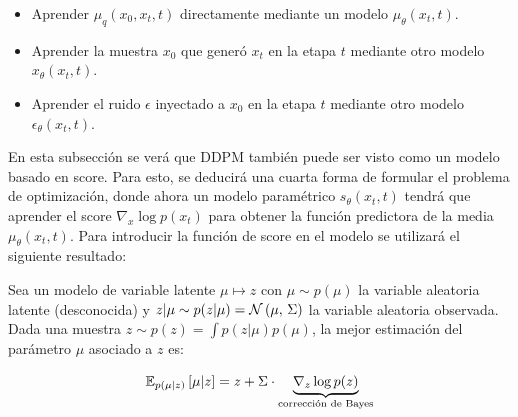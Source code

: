 \begin{itemize}
    \item Aprender $\mu_q(x_0,x_t,t)$ directamente mediante un modelo $\mu_\theta(x_t,t)$.
    \item Aprender la muestra $x_0$ que generó $x_t$ en la etapa $t$ mediante otro modelo $x_\theta(x_t,t)$.
    \item Aprender el ruido $\epsilon$ inyectado a $x_0$ en la etapa $t$ mediante otro modelo $\epsilon_\theta(x_t,t)$.
\end{itemize}

En esta subsección se verá que DDPM también puede ser visto como un modelo basado en score. Para esto, se deducirá una cuarta forma de formular el problema de optimización, donde ahora un modelo paramétrico $s_\theta(x_t,t)$ tendrá que aprender el score $\nabla_x\log p(x_t)$ para obtener la función predictora de la media $\mu_\theta(x_t,t)$. Para introducir la función de score en el modelo se utilizará el siguiente resultado:

\begin{teo}
    Sea un modelo de variable latente $\mu\mapsto z$ con $\mu\sim p(\mu)$ la variable aleatoria latente (desconocida) y $z|\mu\sim p(z|\mu)=\mathcal{N}\left(\mu,\,\Sigma\right)$ la variable aleatoria observada. Dada una muestra $z\sim p(z)= \int p(z|\mu) p(\mu)$, la mejor estimación del parámetro $\mu$ asociado a $z$ es:

    \begin{equation}
        \label{eq:tweedie}
        \mathbb{E}_{p(\mu|z)}\left[\mu|z\right] = z + \Sigma \cdot \underbrace{\nabla_z \log p(z)}_{\text{corrección de Bayes}}
    \end{equation}
\end{teo}

